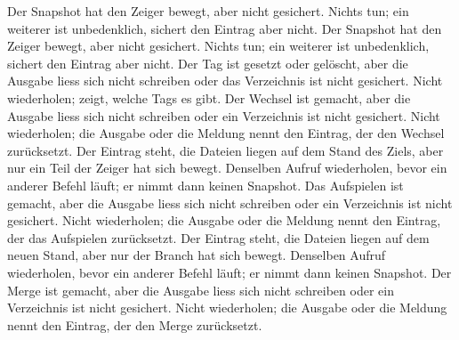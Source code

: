 \stopxrow
\startxrow
\startxcell[width=0.26\textwidth]  \stopxcell
\startxcell[width=0.35\textwidth] Der Snapshot hat den Zeiger bewegt,
aber nicht gesichert. \stopxcell
\startxcell Nichts tun; ein weiterer  ist unbedenklich,
sichert den Eintrag aber nicht. \stopxcell
\stopxrow
\startxrow
\startxcell[width=0.26\textwidth]  \stopxcell
\startxcell[width=0.35\textwidth] Der Snapshot hat den Zeiger bewegt,
aber nicht gesichert. \stopxcell
\startxcell Nichts tun; ein weiterer  ist unbedenklich,
sichert den Eintrag aber nicht. \stopxcell
\stopxrow
\startxrow
\startxcell[width=0.26\textwidth]  \stopxcell
\startxcell[width=0.35\textwidth] Der Tag ist gesetzt oder gelöscht,
aber die Ausgabe liess sich nicht schreiben oder das Verzeichnis ist nicht gesichert. \stopxcell
\startxcell Nicht wiederholen;  zeigt, welche Tags es gibt. \stopxcell
\stopxrow
\startxrow
\startxcell[width=0.26\textwidth]  \stopxcell
\startxcell[width=0.35\textwidth] Der Wechsel ist gemacht,
aber die Ausgabe liess sich nicht schreiben oder ein Verzeichnis ist nicht gesichert. \stopxcell
\startxcell Nicht wiederholen;
die Ausgabe oder die Meldung nennt den Eintrag, der den Wechsel zurücksetzt. \stopxcell
\stopxrow
\startxrow
\startxcell[width=0.26\textwidth]  \stopxcell
\startxcell[width=0.35\textwidth] Der Eintrag steht, die Dateien liegen auf dem Stand des Ziels,
aber nur ein Teil der Zeiger hat sich bewegt. \stopxcell
\startxcell Denselben Aufruf wiederholen, bevor ein anderer Befehl läuft;
er nimmt dann keinen Snapshot. \stopxcell
\stopxrow
\startxrow
\startxcell[width=0.26\textwidth]  \stopxcell
\startxcell[width=0.35\textwidth] Das Aufspielen ist gemacht,
aber die Ausgabe liess sich nicht schreiben oder ein Verzeichnis ist nicht gesichert. \stopxcell
\startxcell Nicht wiederholen;
die Ausgabe oder die Meldung nennt den Eintrag, der das Aufspielen zurücksetzt. \stopxcell
\stopxrow
\startxrow
\startxcell[width=0.26\textwidth]  \stopxcell
\startxcell[width=0.35\textwidth] Der Eintrag steht, die Dateien liegen auf dem neuen Stand,
aber nur der Branch hat sich bewegt. \stopxcell
\startxcell Denselben Aufruf wiederholen, bevor ein anderer Befehl läuft;
er nimmt dann keinen Snapshot. \stopxcell
\stopxrow
\startxrow
\startxcell[width=0.26\textwidth]  \stopxcell
\startxcell[width=0.35\textwidth] Der Merge ist gemacht,
aber die Ausgabe liess sich nicht schreiben oder ein Verzeichnis ist nicht gesichert. \stopxcell
\startxcell Nicht wiederholen;
die Ausgabe oder die Meldung nennt den Eintrag, der den Merge zurücksetzt. \stopxcell
